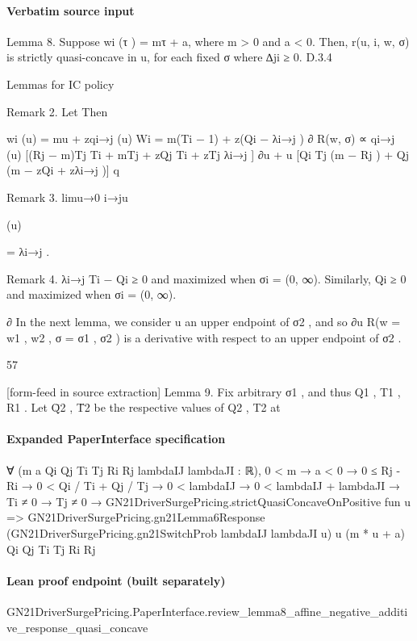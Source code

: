 \documentclass[10pt]{article}
\begin{document}
\paragraph{Verbatim source input}
\begin{ReviewVerbatim}
Lemma 8. Suppose wi (τ ) = mτ + a, where m > 0 and a < 0. Then, r(u, i, w, σ) is strictly
quasi-concave in u, for each fixed σ where ∆ji ≥ 0.
D.3.4

Lemmas for IC policy

Remark 2.
Let
Then

wi (u) = mu + zqi→j (u)
Wi = m(Ti − 1) + z(Qi − λi→j )
∂
R(w, σ) ∝ qi→j (u) [(Rj − m)Tj Ti + mTj + zQj Ti + zTj λi→j ]
∂u
+ u [Qi Tj (m − Rj ) + Qj (m − zQi + zλi→j )]
q

Remark 3. limu→0 i→ju

(u)

= λi→j .

Remark 4. λi→j Ti − Qi ≥ 0 and maximized when σi = (0, ∞). Similarly, Qi ≥ 0 and maximized
when σi = (0, ∞).

∂
In the next lemma, we consider u an upper endpoint of σ2 , and so ∂u
R(w = {w1 , w2 }, σ =
{σ1 , σ2 }) is a derivative with respect to an upper endpoint of σ2 .

57


[form-feed in source extraction]
Lemma 9. Fix arbitrary σ1 , and thus Q1 , T1 , R1 . Let Q̄2 , T̄2 be the respective values of Q2 , T2 at
\end{ReviewVerbatim}


\paragraph{Expanded PaperInterface specification}
\begin{ReviewVerbatim}
∀ (m a Qi Qj Ti Tj Ri Rj lambdaIJ lambdaJI : ℝ),
  0 < m →
    a < 0 →
      0 ≤ Rj - Ri →
        0 < Qi / Ti + Qj / Tj →
          0 < lambdaIJ →
            0 < lambdaIJ + lambdaJI →
              Ti ≠ 0 →
                Tj ≠ 0 →
                  GN21DriverSurgePricing.strictQuasiConcaveOnPositive fun u =>
                    GN21DriverSurgePricing.gn21Lemma6Response
                      (GN21DriverSurgePricing.gn21SwitchProb lambdaIJ lambdaJI u) u (m * u + a) Qi Qj Ti Tj Ri Rj
\end{ReviewVerbatim}

\paragraph{Lean proof endpoint (built separately)}\begin{ReviewVerbatim}
GN21DriverSurgePricing.PaperInterface.review_lemma8_affine_negative_additive_response_quasi_concave
\end{ReviewVerbatim}
\end{document}
